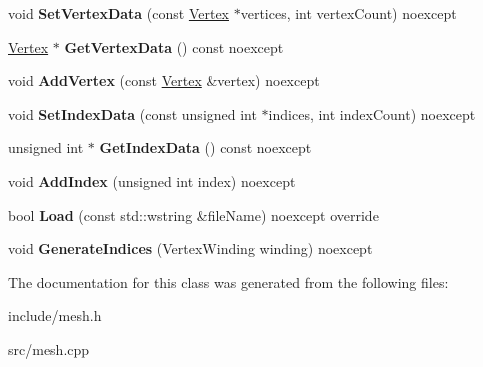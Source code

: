 \begin{DoxyCompactItemize}
\item 
\mbox{\label{class_blade_1_1_mesh_a7814068ad02de9977c5baf671a6d4cc5}} 
void {\bfseries Set\+Vertex\+Data} (const \hyperlink{struct_blade_1_1_vertex}{Vertex} $\ast$vertices, int vertex\+Count) noexcept
\item 
\mbox{\label{class_blade_1_1_mesh_a56d1f9cb6e077fe91eb95452a999f4b3}} 
\hyperlink{struct_blade_1_1_vertex}{Vertex} $\ast$ {\bfseries Get\+Vertex\+Data} () const noexcept
\item 
\mbox{\label{class_blade_1_1_mesh_a5131c65497cf0dbe611162a86d9bb004}} 
void {\bfseries Add\+Vertex} (const \hyperlink{struct_blade_1_1_vertex}{Vertex} \&vertex) noexcept
\item 
\mbox{\label{class_blade_1_1_mesh_ad045ba3e642ff52960589372677270fa}} 
void {\bfseries Set\+Index\+Data} (const unsigned int $\ast$indices, int index\+Count) noexcept
\item 
\mbox{\label{class_blade_1_1_mesh_ac0890adc16e7d52924ccd6ba8f5a2916}} 
unsigned int $\ast$ {\bfseries Get\+Index\+Data} () const noexcept
\item 
\mbox{\label{class_blade_1_1_mesh_a1c77eda2ea16ed8ebeb74dc97dfc2df8}} 
void {\bfseries Add\+Index} (unsigned int index) noexcept
\item 
\mbox{\label{class_blade_1_1_mesh_a999b87101e849d8a6618d95c69387ec1}} 
bool {\bfseries Load} (const std\+::wstring \&file\+Name) noexcept override
\item 
\mbox{\label{class_blade_1_1_mesh_ae9a08be7c3e4c6f6877d99bae35811b6}} 
void {\bfseries Generate\+Indices} (Vertex\+Winding winding) noexcept
\end{DoxyCompactItemize}


The documentation for this class was generated from the following files\+:\begin{DoxyCompactItemize}
\item 
include/mesh.\+h\item 
src/mesh.\+cpp\end{DoxyCompactItemize}

